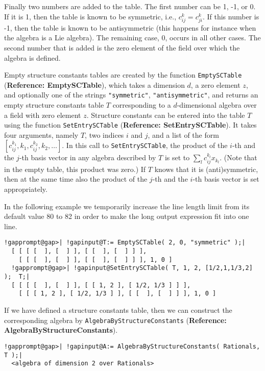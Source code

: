\documentclass[a4paper,11pt]{report}
\begin{document}
{{ Finally two numbers are added to the table. The first number can be 1, -1, or
0. If it is 1, then the table is known to be symmetric, i.e., $c_{ij}^k = c_{ji}^k$. If this number is -1, then the table is known to be antisymmetric (this
happens for instance when the algebra is a Lie algebra). The remaining case,
0, occurs in all other cases. The second number that is added is the zero
element of the field over which the algebra is defined. 

 Empty structure constants tables are created by the function \texttt{EmptySCTable} (\textbf{Reference: EmptySCTable}), which takes a dimension $d$, a zero element $z$, and optionally one of the strings \texttt{"symmetric"}, \texttt{"antisymmetric"}, and returns an empty structure constants table $T$ corresponding to a $d$-dimensional algebra over a field with zero element $z$. Structure constants can be entered into the table $T$ using the function \texttt{SetEntrySCTable} (\textbf{Reference: SetEntrySCTable}). It takes four arguments, namely $T$, two indices $i$ and $j$, and a list of the form $[ c_{ij}^{{k_1}}, k_1, c_{ij}^{{k_2}}, k_2, \ldots ]$. In this call to \texttt{SetEntrySCTable}, the product of the $i$-th and the $j$-th basis vector in any algebra described by $T$ is set to $\sum_l c_{ij}^{{k_l}} x_{{k_l}}$. (Note that in the empty table, this product was zero.) If $T$ knows that it is (anti)symmetric, then at the same time also the product of
the $j$-th and the $i$-th basis vector is set appropriately. 

 In the following example we temporarily increase the line length limit from
its default value 80 to 82 in order to make the long output expression fit
into one line. 

 
\begin{Verbatim}[commandchars=!@|,fontsize=\small,frame=single,label=Example]
  !gapprompt@gap>| !gapinput@T:= EmptySCTable( 2, 0, "symmetric" );|
  [ [ [ [  ], [  ] ], [ [  ], [  ] ] ], 
    [ [ [  ], [  ] ], [ [  ], [  ] ] ], 1, 0 ]
  !gapprompt@gap>| !gapinput@SetEntrySCTable( T, 1, 2, [1/2,1,1/3,2] );  T;|
  [ [ [ [  ], [  ] ], [ [ 1, 2 ], [ 1/2, 1/3 ] ] ], 
    [ [ [ 1, 2 ], [ 1/2, 1/3 ] ], [ [  ], [  ] ] ], 1, 0 ]
\end{Verbatim}
 

 If we have defined a structure constants table, then we can construct the
corresponding algebra by \texttt{AlgebraByStructureConstants} (\textbf{Reference: AlgebraByStructureConstants}). 

 
\begin{Verbatim}[commandchars=!@|,fontsize=\small,frame=single,label=Example]
  !gapprompt@gap>| !gapinput@A:= AlgebraByStructureConstants( Rationals, T );|
  <algebra of dimension 2 over Rationals>
\end{Verbatim}
 

}}
\end{document}
